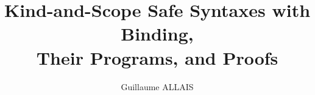 \documentclass{memoir}
\title{Kind-and-Scope Safe Syntaxes with Binding, \\ Their Programs, and Proofs}
\author{Guillaume ALLAIS}
\begin{document}
\maketitle{}

\newpage{}
\tableofcontents{}

\label{introduction-agda}


\label{type-scope-semantics}






\label{properties}





\label{a-universe}



\newpage{}
\listoffigures


\end{document}
